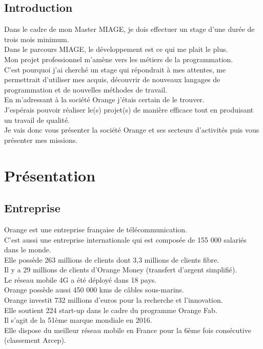 \documentclass[a4paper,twoside,12pt]{report}
\begin{document}
\section{Introduction}
Dans le cadre de mon Master MIAGE, je dois effectuer un stage d’une durée de trois mois minimum.\\
Dans le parcours MIAGE, le développement est ce qui me plait le plus.\\
Mon projet professionnel m'amène vers les métiers de la programmation.\\
C'est pourquoi j'ai cherché un stage qui répondrait à mes attentes, me permettrait d'utiliser mes acquis, découvrir de nouveaux langages de programmation et de nouvelles méthodes de travail.\\
En m'adressant à la société Orange j'étais certain de le trouver.\\
J'espérais pouvoir réaliser le(s) projet(s) de manière efficace tout en produisant un travail de qualité.\\
Je vais donc vous présenter la société Orange et ses secteurs d'activités puis vous présenter mes missions.\\
\chapter{Présentation}
\section{Entreprise}
Orange est une entreprise française de télécommunication.\\
C'est aussi une entreprise internationale qui est composée de 155 000 salariés dans le monde.\\
Elle possède 263 millions de clients dont 3,3 millions de clients fibre.\\
 Il y a 29 millions de clients d’Orange Money (transfert d'argent simplifié).\\ 
 Le réseau mobile 4G a été déployé dans 18 pays.\\
 Orange possède aussi 450 000 kms de câbles sous-marins.\\
Orange investit 732 millions d’euros pour la recherche et l’innovation.\\
Elle soutient 224 start-up dans le cadre du programme Orange Fab.\\
 Il s’agit de la 51ème marque mondiale en 2016.\\ 
 Elle dispose du meilleur réseau mobile en France pour la 6ème fois consécutive (classement Arcep).
\end{document}

